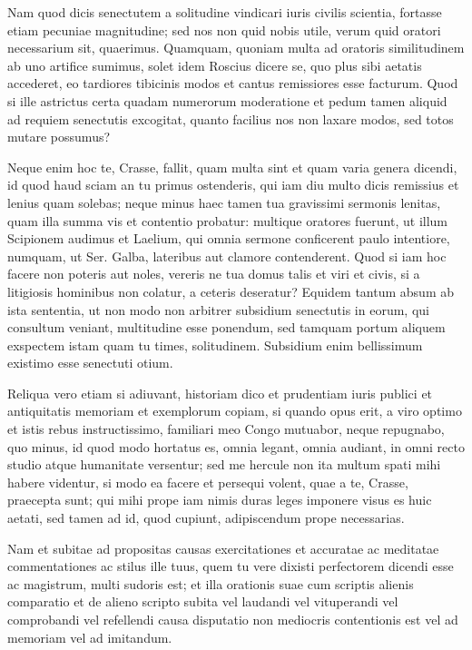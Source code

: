  Nam quod dicis senectutem a solitudine vindicari iuris civilis scientia, fortasse etiam pecuniae magnitudine; sed nos non quid nobis utile, verum quid oratori necessarium sit, quaerimus. Quamquam, quoniam multa ad oratoris similitudinem ab uno artifice sumimus, solet idem Roscius dicere se, quo plus sibi aetatis accederet, eo tardiores tibicinis modos et cantus remissiores esse facturum. Quod si ille astrictus certa quadam numerorum moderatione et pedum tamen aliquid ad requiem senectutis excogitat, quanto facilius nos non laxare modos, sed totos mutare possumus?

 Neque enim hoc te, Crasse, fallit, quam multa sint et quam varia genera dicendi, id quod haud sciam an tu primus ostenderis, qui iam diu multo dicis remissius et lenius quam solebas; neque minus haec tamen tua gravissimi sermonis lenitas, quam illa summa vis et contentio probatur: multique oratores fuerunt, ut illum Scipionem audimus et Laelium, qui omnia sermone conficerent paulo intentiore, numquam, ut Ser. Galba, lateribus aut clamore contenderent. Quod si iam hoc facere non poteris aut noles, vereris ne tua domus talis et viri et civis, si a litigiosis hominibus non colatur, a ceteris deseratur? Equidem tantum absum ab ista sententia, ut non modo non arbitrer subsidium senectutis in eorum, qui consultum veniant, multitudine esse ponendum, sed tamquam portum aliquem exspectem istam quam tu times, solitudinem. Subsidium enim bellissimum existimo esse senectuti otium.

 Reliqua vero etiam si adiuvant, historiam dico et prudentiam iuris publici et antiquitatis memoriam et exemplorum copiam, si quando opus erit, a viro optimo et istis rebus instructissimo, familiari meo Congo mutuabor, neque repugnabo, quo minus, id quod modo hortatus es, omnia legant, omnia audiant, in omni recto studio atque humanitate versentur; sed me hercule non ita multum spati mihi habere videntur, si modo ea facere et persequi volent, quae a te, Crasse, praecepta sunt; qui mihi prope iam nimis duras leges imponere visus es huic aetati, sed tamen ad id, quod cupiunt, adipiscendum prope necessarias.

 Nam et subitae ad propositas causas exercitationes et accuratae ac meditatae commentationes ac stilus ille tuus, quem tu vere dixisti perfectorem dicendi esse ac magistrum, multi sudoris est; et illa orationis suae cum scriptis alienis comparatio et de alieno scripto subita vel laudandi vel vituperandi vel comprobandi vel refellendi causa disputatio non mediocris contentionis est vel ad memoriam vel ad imitandum.

